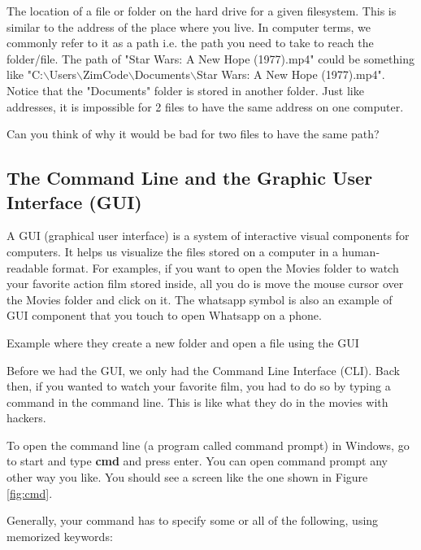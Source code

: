 \begin{definition}[Path] The location of a file or folder on the hard drive for a given filesystem. This is similar to the address of the place where you live. In computer terms, we commonly refer to it as a path i.e. the path you need to take to reach the folder/file. The path of "Star Wars: A New Hope (1977).mp4" could be something like "C:$\backslash$Users$\backslash$ZimCode$\backslash$Documents$\backslash$Star Wars: A New Hope (1977).mp4". Notice that the "Documents" folder is stored in another folder. Just like addresses, it is impossible for 2 files to have the same address on one computer. 
\end{definition}

\begin{problem}Can you think of why it would be bad for two files to have the same path?\end{problem}

\subsection{The Command Line and the Graphic User Interface (GUI)}

A GUI (graphical user interface) is a system of interactive visual components for computers. It helps us visualize the files stored on a computer in a human-readable format. For examples, if you want to open the Movies folder to watch your favorite action film stored inside, all you do is move the mouse cursor over the Movies folder and click on it. The whatsapp symbol is also an example of GUI component that you touch to open Whatsapp on a phone.

\begin{example}
Example where they create a new folder and open a file using the GUI
\end{example}

Before we had the GUI, we only had the Command Line Interface (CLI). Back then, if you wanted to watch your favorite film, you had to do so by typing a command in the command line. This is like what they do in the movies with hackers. 

To open the command line (a program called command prompt) in Windows, go to start and type \textbf{cmd} and press enter. You can open command prompt any other way you like. You should see a screen like the one shown in Figure \ref{fig:cmd}.

Generally, your command has to specify some or all of the following, using memorized keywords:

